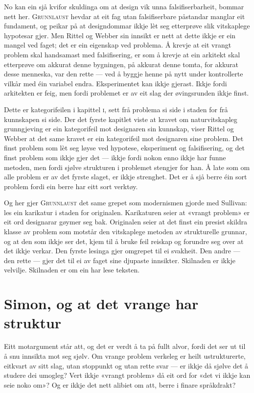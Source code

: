 No kan ein sjå kvifor skuldinga om at design vik unna falsifiserbarheit, bommar nett her. \textsc{Grunnlaust} hevdar at eit fag utan falsifiserbare påstandar manglar eit fundament, og peikar på at designdommar ikkje lèt seg etterprøve slik vitskaplege hypotesar gjer. Men Rittel og Webber sin innsikt er nett at dette ikkje er ein mangel ved faget; det er ein eigenskap ved problema. Å krevje at eit vrangt problem skal handsamast med falsifisering, er som å krevje at ein arkitekt skal etterprøve om akkurat denne bygningen, på akkurat denne tomta, for akkurat desse menneska, var den rette — ved å byggje henne på nytt under kontrollerte vilkår med éin variabel endra. Eksperimentet kan ikkje gjerast. Ikkje fordi arkitekten er feig, men fordi problemet er av eit slag der øvingsrunden ikkje finst.

Dette er kategorifeilen i kapittel \textsc{i}, sett frå problema si side i staden for frå kunnskapen si side. Der det fyrste kapitlet viste at kravet om naturvitskapleg grunngjeving er ein kategorifeil mot designaren sin kunnskap, viser Rittel og Webber at det same kravet er ein kategorifeil mot designaren sine problem. Det finst problem som lèt seg løyse ved hypotese, eksperiment og falsifisering, og det finst problem som ikkje gjer det — ikkje fordi nokon enno ikkje har funne metoden, men fordi sjølve strukturen i problemet stengjer for han. Å late som om alle problem er av det fyrste slaget, er ikkje strenghet. Det er å sjå berre éin sort problem fordi ein berre har eitt sort verktøy.

Og her gjer \textsc{Grunnlaust} det same grepet som modernismen gjorde med Sullivan: les ein karikatur i staden for originalen. Karikaturen seier at «vrangt problem» er eit ord designarar gøymer seg bak. Originalen seier at det finst ein presist skildra klasse av problem som motstår den vitskaplege metoden av strukturelle grunnar, og at den som ikkje ser det, kjem til å bruke feil reiskap og forundre seg over at det ikkje verkar. Den fyrste lesinga gjer omgrepet til ei svakheit. Den andre — den rette — gjer det til ei av faget sine djupaste innsikter. Skilnaden er ikkje velvilje. Skilnaden er om ein har lese teksten.

\section{Simon, og at det vrange har struktur}

Eitt motargument står att, og det er verdt å ta på fullt alvor, fordi det ser ut til å snu innsikta mot seg sjølv. Om vrange problem verkeleg er heilt ustrukturerte, eitkvart av sitt slag, utan stoppunkt og utan rette svar — er ikkje då sjølve det å studere dei umogleg? Vert ikkje «vrangt problem» då eit ord for «det vi ikkje kan seie noko om»? Og er ikkje det nett alibiet om att, berre i finare språkdrakt?

